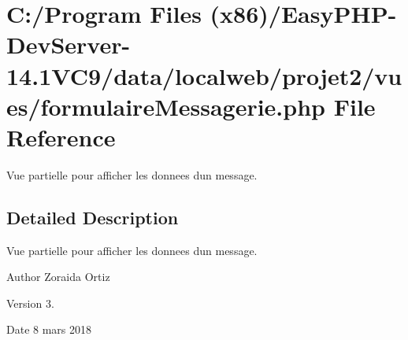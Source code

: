 \hypertarget{formulaire_messagerie_8php}{}\section{C\+:/\+Program Files (x86)/\+Easy\+P\+H\+P-\/\+Dev\+Server-\/14.1\+V\+C9/data/localweb/projet2/vues/formulaire\+Messagerie.php File Reference}
\label{formulaire_messagerie_8php}


Vue partielle pour afficher les donnees d\textquotesingle{}un message.  




\subsection{Detailed Description}
Vue partielle pour afficher les donnees d\textquotesingle{}un message. 

\begin{DoxyAuthor}{Author}
Zoraida Ortiz 
\end{DoxyAuthor}
\begin{DoxyVersion}{Version}
3. 
\end{DoxyVersion}
\begin{DoxyDate}{Date}
8 mars 2018 
\end{DoxyDate}
